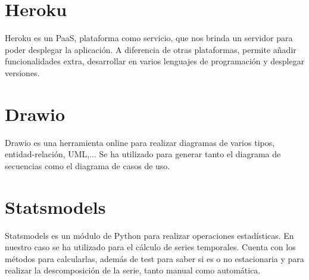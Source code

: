 \section{Heroku}
Heroku \cite{heroku} es un PaaS, plataforma como servicio, que nos brinda un servidor para poder desplegar la aplicación.
A diferencia de otras plataformas, permite añadir funcionalidades extra, desarrollar en varios lenguajes de programación y desplegar versiones.

\section{Drawio}
Drawio \cite{drawio} es una herramienta online para realizar diagramas de varios tipos, entidad-relación, UML,... Se ha utilizado para generar tanto el diagrama de secuencias como el diagrama de casos de uso.

\section{Statsmodels}
Statsmodels \cite{statsmodels} es un módulo de Python para realizar operaciones estadísticas. En nuestro caso se ha utilizado para el cálculo de series temporales. Cuenta con los métodos para calcularlas, además de test para saber si es o no estacionaria y para realizar la descomposición de la serie, tanto manual como automática.